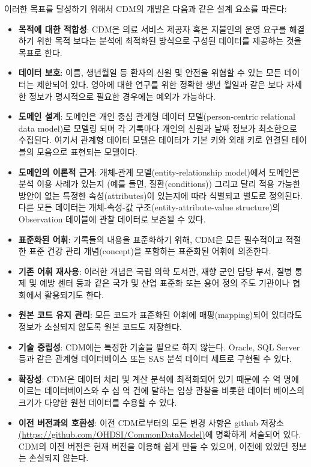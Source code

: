 \documentclass[11pt]{book}
\providecommand{\tightlist}{%
  \setlength{\itemsep}{0pt}\setlength{\parskip}{0pt}}
\theoremstyle{definition}
\theoremstyle{definition}
\theoremstyle{definition}
\theoremstyle{remark}
\begin{document}
이러한 목표를 달성하기 위해서 CDM의 개발은 다음과 같은 설계 요소를
따른다:

\begin{itemize}
\tightlist
\item
  \textbf{목적에 대한 적합성}: CDM은 의료 서비스 제공자 혹은 지불인의
  운영 요구를 해결하기 위한 목적 보다는 분석에 최적화된 방식으로 구성된
  데이터를 제공하는 것을 목표로 한다.
\item
  \textbf{데이터 보호}: 이름, 생년월일 등 환자의 신원 및 안전을 위협할
  수 있는 모든 데이터는 제한되어 있다. 영아에 대한 연구를 위한 정확한
  생년 월일과 같은 보다 자세한 정보가 명시적으로 필요한 경우에는 예외가
  가능하다.
\item
  \textbf{도메인 설계}: 도메인은 개인 중심 관계형 데이터
  모델(person-centric relational data model)로 모델링 되며 각 기록마다
  개인의 신원과 날짜 정보가 최소한으로 수집된다. 여기서 관계형 데이터
  모델은 데이터가 기본 키와 외래 키로 연결된 테이블의 모음으로 표현되는
  모델이다.
\item
  \textbf{도메인의 이론적 근거}: 개체-관계 모델(entity-relationship
  model)에서 도메인은 분석 이용 사례가 있는지 (예를 들면,
  질환(conditions)) 그리고 달리 적용 가능한 방안이 없는 특정한
  속성(attributes)이 있는지에 따라 식별되고 별도로 정의된다. 다른 모든
  데이터는 개체-속성-값 구조(entity-attribute-value structure)의
  Observation 테이블에 관찰 데이터로 보존될 수 있다.
\item
  \textbf{표준화된 어휘}: 기록들의 내용을 표준화하기 위해, CDM은 모든
  필수적이고 적절한 표준 건강 관리 개념(concept)을 포함하는 표준화된
  어휘에 의존한다.
\item
  \textbf{기존 어휘 재사용}: 이러한 개념은 국립 의학 도서관, 재향 군인
  담당 부서, 질병 통제 및 예방 센터 등과 같은 국가 및 산업 표준화 또는
  용어 정의 주도 기관이나 협회에서 활용되기도 한다.
\item
  \textbf{원본 코드 유지 관리}: 모든 코드가 표준화된 어휘에
  매핑(mapping)되어 있더라도 정보가 소실되지 않도록 원본 코드도
  저장한다. 
\item
  \textbf{기술 중립성}: CDM에는 특정한 기술을 필요로 하지 않는다.
  Oracle, SQL Server 등과 같은 관계형 데이터베이스 또는 SAS 분석 데이터
  세트로 구현될 수 있다. 
\item
  \textbf{확장성}: CDM은 데이터 처리 및 계산 분석에 최적화되어 있기
  때문에 수 억 명에 이르는 데이터베이스와 수 십 억 건에 달하는 임상
  관찰을 비롯한 데이터 베이스의 크기가 다양한 원천 데이터를 수용할 수
  있다. 
\item
  \textbf{이전 버전과의 호환성}: 이전 CDM로부터의 모든 변경 사항은
  github 저장소
  \href{https://github.com/OHDSI/CommonDataModel}{(https://github.com/OHDSI/CommonDataModel)}에
  명확하게 서술되어 있다. CDM의 이전 버전은 현재 버전을 이용해 쉽게 만들
  수 있으며, 이전에 있었던 정보는 손실되지 않는다.
\end{itemize}
\end{document}
